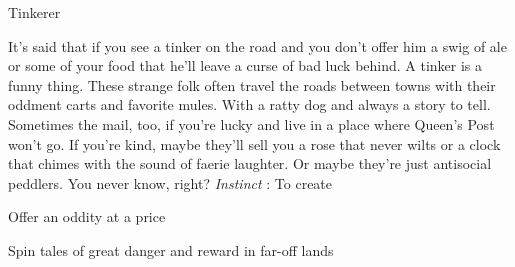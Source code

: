 \stopitemize
 
\startMonsterName
Tinkerer	
\stopMonsterName
 
\startMonsterDescription
It’s said that if you see a tinker on the road and you don’t offer him a swig of ale or some of your food that he’ll leave a curse of bad luck behind. A tinker is a funny thing. These strange folk often travel the roads between towns with their oddment carts and favorite mules. With a ratty dog and always a story to tell. Sometimes the mail, too, if you’re lucky and live in a place where Queen’s Post won’t go. If you’re kind, maybe they’ll sell you a rose that never wilts or a clock that chimes with the sound of faerie laughter. Or maybe they’re just antisocial peddlers. You never know, right? {\em Instinct} : To create
\stopMonsterDescription
 
\startitemize[1,packed]

\item Offer an oddity at a price

 
\item Spin tales of great danger and reward in far-off lands


\stopitemize
 






